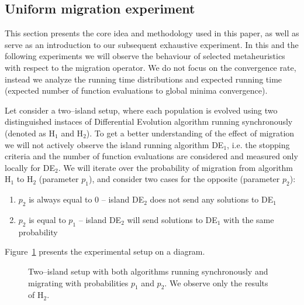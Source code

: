 \documentclass{sig-alternate}
\begin{document}
\subsection{Uniform migration experiment}
This section presents the core idea and methodology used in this paper, as well as serve as an introduction to our subsequent exhaustive experiment.
In this and the following experiments we will observe the behaviour of selected metaheuristics with respect to the migration operator.
We do not focus on the convergence rate, instead we analyze the running time distributions and expected running time (expected number of function evaluations to global minima convergence).

Let consider a two--island setup, where each population is evolved using two distinguished instaces of Differential Evolution algorithm running synchronously (denoted as H$_1$ and H$_2$).
To get a better understanding of the effect of migration we will not actively observe the island running algorithm DE$_1$, i.e. the stopping criteria and the number of function evaluations are considered and measured only locally for DE$_2$.
We will iterate over the probability of migration from algorithm H$_1$ to H$_2$ (parameter $p_1$), and consider two cases for the opposite (parameter $p_2$): 
\begin{enumerate}
    \item $p_2$ is always equal to 0 -- island DE$_2$ does not send any solutions to DE$_1$
    \item $p_2$ is equal to $p_1$ -- island DE$_2$ will send solutions to DE$_1$ with the same probability
\end{enumerate}
Figure~\ref{graph:twoisl} presents the experimental setup on a diagram.
\begin{figure}[ht!]
    \label{graph:twoisl}
    \caption{Two--island setup with both algorithms running synchronously and migrating with probabilities $p_1$ and $p_2$. We observe only the results of H$_2$.}

\end{figure}
\end{document}
